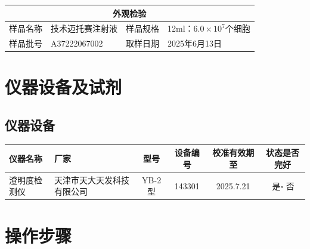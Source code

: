 \documentclass[UTF8,10pt,a4paper,fontset=fandol]{ctexart}
\newcommand{\fieldvalue}[1]{#1}
\newcommand{\handwritten}[1]{#1}
\begin{document}
\begin{tabularx}{\textwidth}{|l|X|l|X|}
\hline
\multicolumn{4}{|c|}{外观检验}\\
\hline
样品名称 &
\fieldvalue{技术迈托赛注射液} &
样品规格 &
\fieldvalue{12ml：$6.0\times10^7$个细胞}\\
\hline
样品批号 &
\fieldvalue{\handwritten{A37222067002}} &
取样日期 &
\fieldvalue{\handwritten{2025年6月13日}}\\
\hline
\end{tabularx}

\section{仪器设备及试剂}

\subsection{仪器设备}

\begin{tabularx}{\textwidth}{|l|X|c|c|c|c|}
\hline
仪器名称 & 厂家 & 型号 & 设备编号 & 校准有效期至 & 状态是否完好\\
\hline
澄明度检测仪 &
\fieldvalue{天津市天大天发科技有限公司} &
\fieldvalue{YB-2型} &
\fieldvalue{\handwritten{143301}} &
\fieldvalue{\handwritten{2025.7.21}} &
\fieldvalue{\handwritten{\checkmark}\,是}\quad$\square$ 否\\
\hline
    \end{tabularx}

\section{操作步骤}
\end{document}
